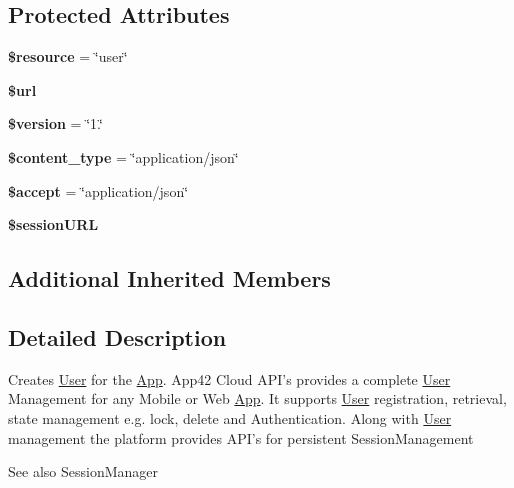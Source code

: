 \subsection*{Protected Attributes}
\begin{DoxyCompactItemize}
\item 
\hypertarget{class_user_service_abd4c7b8b084214b8d2533ba07fce6b83}{{\bfseries \$resource} = \char`\"{}user\char`\"{}}\label{class_user_service_abd4c7b8b084214b8d2533ba07fce6b83}

\item 
\hypertarget{class_user_service_acf215f34a917d014776ce684a9ee8909}{{\bfseries \$url}}\label{class_user_service_acf215f34a917d014776ce684a9ee8909}

\item 
\hypertarget{class_user_service_a17c8948c68aa44fa9961ae169b6a8961}{{\bfseries \$version} = \char`\"{}1.\char`\"{}}\label{class_user_service_a17c8948c68aa44fa9961ae169b6a8961}

\item 
\hypertarget{class_user_service_ae754d6373f275e781f47c8bc9b994b6d}{{\bfseries \$content\+\_\+type} = \char`\"{}application/json\char`\"{}}\label{class_user_service_ae754d6373f275e781f47c8bc9b994b6d}

\item 
\hypertarget{class_user_service_a75fc18c4ff06288ff9fdf8aba9bd1081}{{\bfseries \$accept} = \char`\"{}application/json\char`\"{}}\label{class_user_service_a75fc18c4ff06288ff9fdf8aba9bd1081}

\item 
\hypertarget{class_user_service_aedf4e9ab2dfedd4d20ad1f15d08777d3}{{\bfseries \$session\+U\+R\+L}}\label{class_user_service_aedf4e9ab2dfedd4d20ad1f15d08777d3}

\end{DoxyCompactItemize}
\subsection*{Additional Inherited Members}


\subsection{Detailed Description}
Creates \hyperlink{class_user}{User} for the \hyperlink{class_app}{App}. App42 Cloud A\+P\+I's provides a complete \hyperlink{class_user}{User} Management for any Mobile or Web \hyperlink{class_app}{App}. It supports \hyperlink{class_user}{User} registration, retrieval, state management e.\+g. lock, delete and Authentication. Along with \hyperlink{class_user}{User} management the platform provides A\+P\+I's for persistent Session\+Management \begin{DoxySeeAlso}{See also}
Session\+Manager 
\end{DoxySeeAlso}


